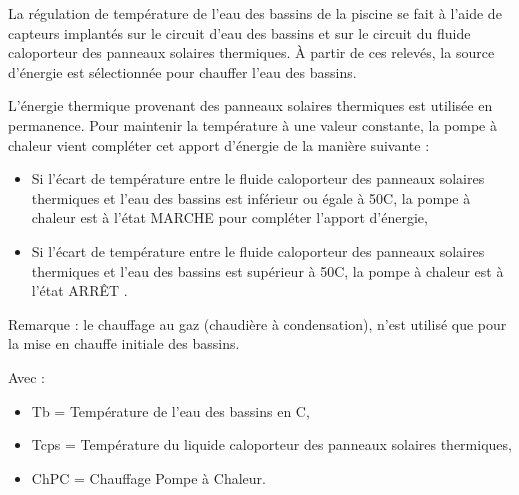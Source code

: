 



La régulation de température de l'eau des bassins de la piscine se fait à l'aide de capteurs implantés sur le circuit d'eau des bassins et sur le circuit du fluide caloporteur des panneaux solaires thermiques. À partir de ces relevés, la source d'énergie est sélectionnée pour chauffer l'eau des bassins.

L'énergie thermique provenant des panneaux solaires thermiques est utilisée en permanence. Pour maintenir la température à une valeur constante, la pompe à chaleur vient compléter cet apport d'énergie de la manière suivante :
\begin{itemize}
 \item Si l'écart de température entre le fluide caloporteur des panneaux solaires thermiques et l'eau des bassins est inférieur ou égale à 50\textdegree C, la pompe à chaleur est à l'état \og MARCHE \fg pour compléter l'apport d'énergie,
 \item Si l'écart de température entre le fluide caloporteur des panneaux solaires thermiques et l'eau des bassins est supérieur à 50\textdegree C, la pompe à chaleur est à l'état \og ARRÊT \fg.
\end{itemize}

Remarque : le chauffage au gaz (chaudière à condensation), n'est utilisé que pour la mise en chauffe initiale des bassins.

Avec :
\begin{itemize}
 \item Tb = Température de l'eau des bassins en \textdegree C,
 \item Tcps = Température du liquide caloporteur des panneaux solaires thermiques,
 \item ChPC = Chauffage Pompe à Chaleur.
\end{itemize}

